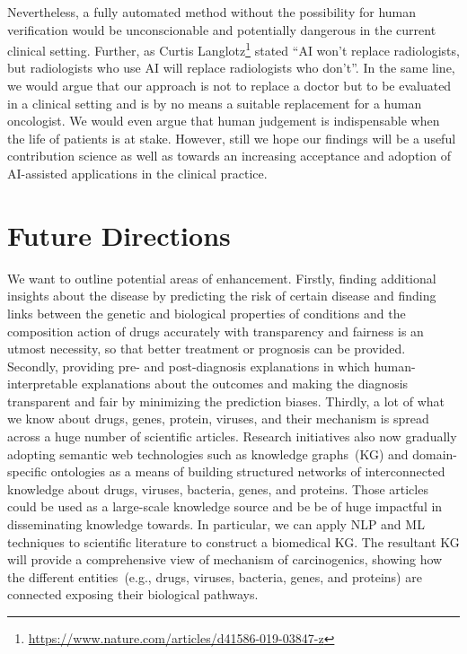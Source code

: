 \hspace*{5mm} Nevertheless, a fully automated method without the possibility for human verification would be unconscionable and potentially dangerous in the current clinical setting. Further, as Curtis Langlotz\footnote{\url{https://www.nature.com/articles/d41586-019-03847-z}} stated ``AI won't replace radiologists, but radiologists who use AI will replace radiologists who don't''. In the same line, we would argue that our approach is not to replace a doctor but to be evaluated in a clinical setting and is by no means a suitable replacement for a human oncologist. We would even argue that human judgement is indispensable when the life of patients is at stake. However, still we hope our findings will be a useful contribution science as well as towards an increasing acceptance and adoption of AI-assisted applications in the clinical practice. 

\section{Future Directions}
We want to outline potential areas of enhancement. Firstly, finding additional insights about the disease by predicting the risk of certain disease and finding links between the genetic and biological properties of conditions and the composition action of drugs accurately with transparency and fairness is an utmost necessity, so that better treatment or prognosis can be provided. Secondly, providing pre- and post-diagnosis explanations in which human-interpretable explanations about the outcomes and making the diagnosis transparent and fair by minimizing the prediction biases. Thirdly, a lot of what we know about drugs, genes, protein, viruses, and their mechanism is spread across a huge number of scientific articles. Research initiatives also now gradually adopting semantic web technologies such as knowledge graphs~(KG) and domain-specific ontologies as a means of building structured networks of interconnected knowledge about drugs, viruses, bacteria, genes, and proteins. Those articles could be used as a large-scale knowledge source and be be of huge impactful in disseminating knowledge towards. In particular, we can apply NLP and ML techniques to scientific literature to construct a biomedical KG. The resultant KG will provide a comprehensive view of mechanism of carcinogenics, showing how the different entities~(e.g., drugs, viruses, bacteria, genes, and proteins) are connected exposing their biological pathways. 

